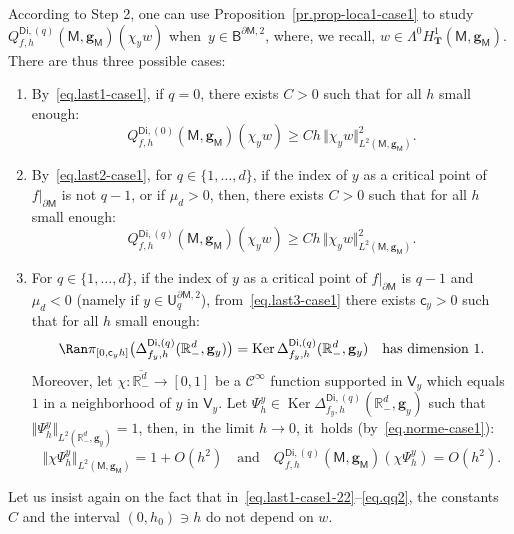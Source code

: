 \documentclass[JEP,XML,SOM,Unicode,NoEqCountersInSection,NoFloatCountersInSection,published]{cedram}
\newcommand{\quand}{\quad\text{and}\quad}
\newcommand{\mbf}[1]{\mathbf{#1}}
\let\pa\partial
\DeclareMathOperator\Ker{Ker}
\theoremstyle{plain}
\theoremstyle{definition}
\begin{document}
According to Step 2, one can use Proposition~\ref{pr.prop-loca1-case1}
to study $Q_{f,h}^{\mathsf{Di},(q)}(\mathsf M,\mbf g_{\mathsf M})(\chi_y w)$ when~$y\in \mathsf B^{\pa \mathsf M,2}$, where, we
recall, $w\in \Lambda^0H^1_{\mbf T}(\mathsf M,\mbf g_{\mathsf M})$. There are thus three possible cases:
\begin{enumerate}
\item\label{step:31}
By~\eqref{eq.last1-case1}, if $q=0$, there exists $C>0$ such that for all $h$ small enough:
\begin{equation}\label{eq.last1-case1-22}
Q_{f,h}^{\mathsf{Di},(0)}(\mathsf M,\mbf g_{\mathsf M})(\chi_y w)\ge Ch\, \Vert \chi_y w \Vert_{L^2(\mathsf M,\mbf g_{\mathsf M})}^2.
\end{equation}
\item\label{step:32}
By~\eqref{eq.last2-case1}, for $q\in \{1,\ldots,d\}$, if the
index of $y$ as a critical point of $f|_{\pa \mathsf M}$ is not $q-1$, or if $\mu_{d}>0$, then, there exists $C>0$ such that for all $h$ small enough:
\begin{equation}\label{eq.qq2}
Q_{f,h}^{\mathsf{Di},(q)}(\mathsf M,\mbf g_{\mathsf M})(\chi_y w)\ge Ch\, \Vert\chi_y w \Vert_{L^2(\mathsf M,\mbf g_{\mathsf M})}^2.
\end{equation}

\item\label{step:33}
For $q\in \{1,\ldots,d\}$, if the index of $y$ as a critical point of
$f|_{\pa \mathsf M}$ is $q-1$ and $\mu_{d}<0$ (namely if $y \in \mathsf U^{\pa \mathsf M,2}_q$),
from~\eqref{eq.last3-case1} there exists $\mathsf c_y>0$ such that
for all $h$ small enough:
\begin{equation}\label{eq.span=11}
\Ran \pi_{[0,\mathsf c_yh]}\bigl(\Delta_{f_y,h}^{\mathsf{Di},(q)}(\mathbb R_-^d,\mbf g_y)\bigr)=\Ker \Delta_{f_y,h}^{\mathsf{Di},(q)}(\mathbb R_-^d,\mbf g_y)\quad \text{has dimension } 1.
\end{equation}
Moreover, let $\chi: \overline{\mathbb R^{d}_-}\to [0,1]$ be a $\mathcal C^\infty$ function supported in $\mathsf V_y$ which equals~$1$ in a neighborhood of $y$ in $\mathsf V_y$.
Let $\Psi_h^y\in \Ker \Delta_{f_y,h}^{\mathsf{Di},(q)}(\mathbb R_-^d,\mbf g_y)$ such that $\Vert \Psi_h^y \Vert_{L^2(\mathbb R^d_-,\mbf g_y)}=1$, then, in~the limit $h\to 0$, it~holds (by~\eqref{eq.norme-case1}):
\begin{equation}\label{eq.norme-case1-2}
\Vert \chi \Psi_h^y \Vert_{L^2(\mathsf M,\mbf g_{\mathsf M})} =1+O (h^{2}) \quand Q_{f,h}^{\mathsf{Di},(q)}(\mathsf M,\mbf g_{\mathsf M})(\chi \Psi_h^y)=O(h^2).
\end{equation}
\end{enumerate}
Let us insist again on the fact that in~\eqref{eq.last1-case1-22}--\eqref{eq.qq2}, the constants $C$
and the interval $(0,h_0) \ni h$ do not depend on $w$.
\end{document}
